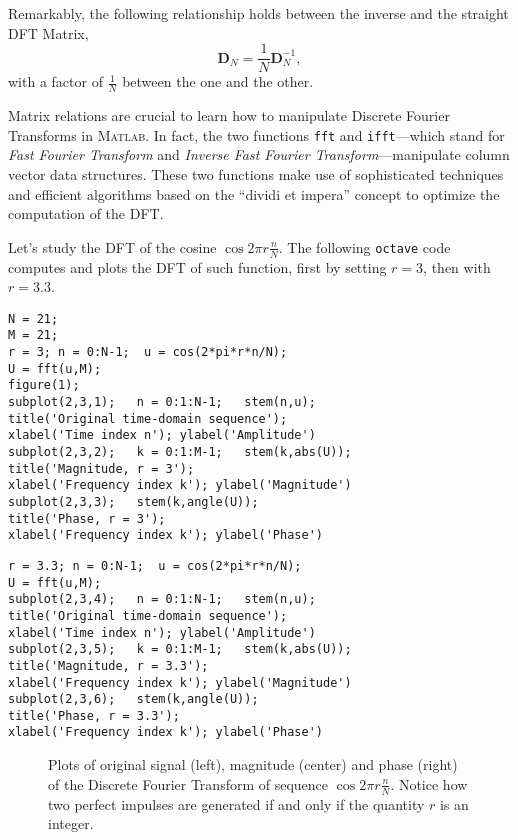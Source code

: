 \documentclass[\documentfontsize, twocolumn]{\classname}
\begin{document}
Remarkably, the following relationship holds between the inverse and the straight DFT Matrix,
\[
    \bm D_N = \frac 1 N \bm D^{-1}_N,
\]
with a factor of $\frac 1 N$ between the one and the other.

Matrix relations are crucial to learn how to manipulate Discrete Fourier Transforms in \textsc{Matlab}. In fact, the two functions \texttt{fft} and \texttt{ifft}---which stand for \emph{Fast Fourier Transform} and \emph{Inverse Fast Fourier Transform}---manipulate column vector data structures. These two functions make use of sophisticated techniques and efficient algorithms based on the ``dividi et impera'' concept to optimize the computation of the DFT.

Let's study the DFT of the cosine $\cos{2\pi r \frac{n}{N}}$. The following \texttt{octave} code computes and plots the DFT of such function, first by setting $r=3$, then with $r=3.3$.
\begin{verbatim}
N = 21;
M = 21;
r = 3; n = 0:N-1;  u = cos(2*pi*r*n/N);
U = fft(u,M);
figure(1);
subplot(2,3,1);   n = 0:1:N-1;   stem(n,u);
title('Original time-domain sequence');
xlabel('Time index n'); ylabel('Amplitude')
subplot(2,3,2);   k = 0:1:M-1;   stem(k,abs(U));
title('Magnitude, r = 3');
xlabel('Frequency index k'); ylabel('Magnitude')
subplot(2,3,3);   stem(k,angle(U));
title('Phase, r = 3');
xlabel('Frequency index k'); ylabel('Phase')
\end{verbatim}

\begin{verbatim}
r = 3.3; n = 0:N-1;  u = cos(2*pi*r*n/N);
U = fft(u,M);
subplot(2,3,4);   n = 0:1:N-1;   stem(n,u);
title('Original time-domain sequence');
xlabel('Time index n'); ylabel('Amplitude')
subplot(2,3,5);   k = 0:1:M-1;   stem(k,abs(U));
title('Magnitude, r = 3.3');
xlabel('Frequency index k'); ylabel('Magnitude')
subplot(2,3,6);   stem(k,angle(U));
title('Phase, r = 3.3');
xlabel('Frequency index k'); ylabel('Phase')
\end{verbatim}

\begin{figure*}[ht]
\begin{center}
\scalebox{0.6}{

}\caption{Plots of original signal (left), magnitude (center) and phase (right) of the Discrete Fourier Transform of sequence $\cos{2\pi r \frac{n}{N}}$. Notice how two perfect impulses are generated if and only if the quantity $r$ is an integer.}\label{oct:dftCosine}
\end{center}
\end{figure*}
\end{document}
